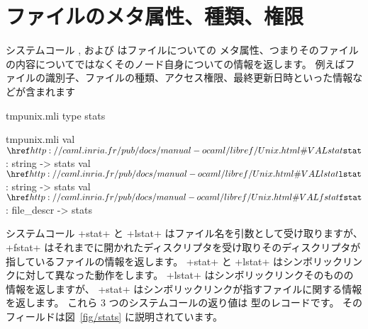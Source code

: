 \section{ファイルのメタ属性、種類、権限}

システムコール ,  および  はファイルについての
メタ属性、つまりそのファイルの内容についてではなくそのノード自身についての情報を返します。
例えばファイルの識別子、ファイルの種類、アクセス権限、最終更新日時といった情報などが含まれます
%
\begin{codefile}{tmpunix.mli}
type stats
\end{codefile}
%
\begin{listingcodefile}{tmpunix.mli}
val $\libvalue{Unix}{stat}$  : string -> stats
val $\libvalue{Unix}{lstat}$ : string -> stats
val $\libvalue{Unix}{fstat}$ : file_descr -> stats
\end{listingcodefile}
%
システムコール \ml+stat+ と \ml+lstat+ はファイル名を引数として受け取りますが、
\ml+fstat+ はそれまでに開かれたディスクリプタを受け取りそのディスクリプタが指しているファイルの情報を返します。
\ml+stat+ と \ml+lstat+ はシンボリックリンクに対して異なった動作をします。
\ml+lstat+ はシンボリックリンクそのものの情報を返しますが、
\ml+stat+ はシンボリックリンクが指すファイルに関する情報を返します。
これら 3 つのシステムコールの返り値は  型のレコードです。
そのフィールドは図~\ref{fig/stats} に説明されています。
%

